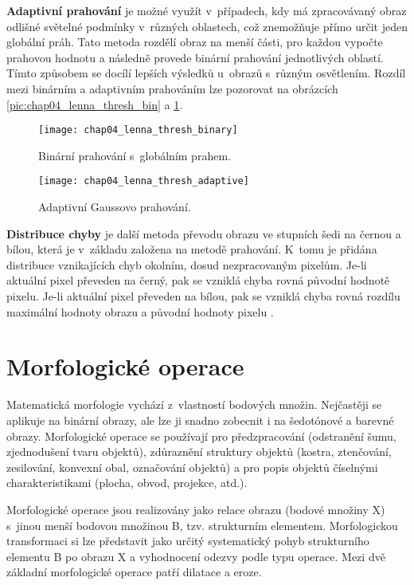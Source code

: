 \textbf{Adaptivní prahování} je možné využít v~případech, kdy má zpracovávaný obraz odlišné světelné podmínky v~různých oblastech, což znemožňuje přímo určit jeden globální práh. Tato metoda rozdělí obraz na menší části, pro každou vypočte prahovou hodnotu a následně provede binární prahování jednotlivých oblastí. Tímto způsobem se docílí lepších výsledků u~obrazů s~různým osvětlením. Rozdíl mezi binárním a adaptivním prahováním lze pozorovat na obrázcích \ref{pic:chap04_lenna_thresh_bin} a \ref{pic:chap04_lenna_thresh_ada}.

\begin{figure}[h]
  \begin{minipage}[c]{0.47\textwidth}
    \texttt{[image: chap04\_lenna\_thresh\_binary]}
    \caption{Binární prahování s~globálním prahem.}
    \label{pic:chap04_lenna_thresh_bin}
  \end{minipage}
  \hfill
  \begin{minipage}[c]{0.47\textwidth}
    \texttt{[image: chap04\_lenna\_thresh\_adaptive]}
    \caption{Adaptivní Gaussovo prahování.}
    \label{pic:chap04_lenna_thresh_ada}
  \end{minipage}
\end{figure}

\textbf{Distribuce chyby} je další metoda převodu obrazu ve stupních šedi na černou a bílou, která je v~základu založena na metodě prahování. K~tomu je přidána distribuce vznikajících chyb okolním, dosud nezpracovaným pixelům. Je-li aktuální pixel převeden na černý, pak se vzniklá chyba rovná původní hodnotě pixelu. Je-li aktuální pixel převeden na bílou, pak se vzniklá chyba rovná rozdílu maximální hodnoty obrazu a původní hodnoty pixelu \cite{izg}.

\pagebreak
\section{Morfologické operace}
Matematická morfologie vychází z~vlastností bodových množin. Nejčastěji se aplikuje na binární obrazy, ale lze ji snadno zobecnit i na šedotónové a barevné obrazy. Morfologické operace se používají pro předzpracování (odstranění šumu, zjednodušení tvaru objektů), zdůraznění struktury objektů (kostra, ztenčování, zesilování, konvexní obal, označování objektů) a pro popis objektů číselnými charakteristikami (plocha, obvod, projekce, atd.).

Morfologické operace jsou realizovány jako relace obrazu (bodové množiny X) s~jinou menší bodovou množinou B, tzv. strukturním elementem. Morfologickou transformaci si lze představit jako určitý systematický pohyb strukturního elementu B po obrazu X a vyhodnocení odezvy podle typu operace. Mezi dvě základní morfologické operace patří dilatace a eroze.

